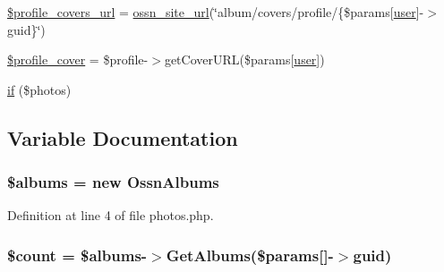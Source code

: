 \begin{DoxyCompactItemize}
\item 
\hyperlink{photos_2pages_2photos_8php_aab05889c3b1ad8df5f0a1929858d42aa}{\$profile\+\_\+covers\+\_\+url} = \hyperlink{ossn_8lib_8system_8php_a2f12f9244f99eccd1225afb76ef2ab65}{ossn\+\_\+site\+\_\+url}(\char`\"{}album/covers/profile/\{\$params\mbox{[}\textquotesingle{}\hyperlink{ossn_8config_8db_8example_8php_a802544b7ba9f79bbf24ef67773d53bed}{user}\textquotesingle{}\mbox{]}-\/$>$guid\}\char`\"{})
\item 
\hyperlink{photos_2pages_2photos_8php_ae6444f624d36ebfb80136c969122ece4}{\$profile\+\_\+cover} = \$profile-\/$>$get\+Cover\+U\+RL(\$params\mbox{[}\textquotesingle{}\hyperlink{ossn_8config_8db_8example_8php_a802544b7ba9f79bbf24ef67773d53bed}{user}\textquotesingle{}\mbox{]})
\item 
\hyperlink{photos_2pages_2photos_8php_a866f96068cd497b122fcd4efd2ebfff4}{if} (\$photos)
\end{DoxyCompactItemize}


\subsection{Variable Documentation}
\subsubsection[{\texorpdfstring{\$albums}{$albums}}]{\setlength{\rightskip}{0pt plus 5cm}\$albums = new {\bf Ossn\+Albums}}\hypertarget{photos_2pages_2photos_8php_a23e8244caaacd14d608137a383e8f0e7}{}\label{photos_2pages_2photos_8php_a23e8244caaacd14d608137a383e8f0e7}


Definition at line 4 of file photos.\+php.

\subsubsection[{\texorpdfstring{\$count}{$count}}]{\setlength{\rightskip}{0pt plus 5cm}\${\bf count} = \$albums-\/$>$Get\+Albums(\$params\mbox{[}\textquotesingle{}\mbox{]}-\/$>$guid)}\hypertarget{photos_2pages_2photos_8php_af789423037bbc89dc7c850e761177570}{}\label{photos_2pages_2photos_8php_af789423037bbc89dc7c850e761177570}


